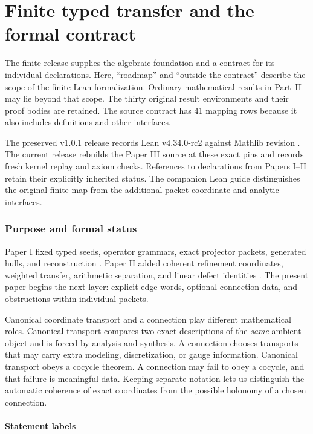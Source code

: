 \part{Finite typed transfer and the formal contract}\label{part:finite}
\noindent The finite release supplies the algebraic foundation and a contract for its individual declarations. Here, ``roadmap'' and ``outside the contract'' describe the scope of the finite Lean formalization. Ordinary mathematical results in Part~II may lie beyond that scope. The thirty original result environments and their proof bodies are retained. The source contract has 41 mapping rows because it also includes definitions and other interfaces.

\medskip\noindent The preserved v1.0.1 release records Lean v4.34.0-rc2 against Mathlib revision  \cite{lean,mathlib}. The current release rebuilds the Paper III source at these exact pins and records fresh kernel replay and axiom checks. References to declarations from Papers I--II retain their explicitly inherited status. The companion Lean guide distinguishes the original finite map from the additional packet-coordinate and analytic interfaces.
\section{Purpose and formal status}
\label{sec:purpose}

Paper I fixed typed seeds, operator grammars, exact projector packets,
generated hulls, and reconstruction \cite{paperI}.  Paper II added coherent
refinement coordinates, weighted transfer, arithmetic separation, and linear
defect identities \cite{paperII}.  The present paper begins the next layer:
explicit edge words, optional connection data, and obstructions within
individual packets.

Canonical coordinate transport and a connection play different mathematical
roles. Canonical transport compares two exact descriptions of the
\emph{same} ambient object and is forced by analysis and synthesis. A
connection chooses transports that may carry extra modeling, discretization,
or gauge information. Canonical transport obeys a cocycle theorem. A
connection may fail to obey a cocycle, and that failure is meaningful data.
Keeping separate notation lets us distinguish the automatic coherence of
exact coordinates from the possible holonomy of a chosen connection.

\subsection{Statement labels}

